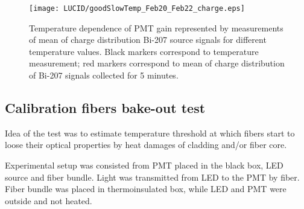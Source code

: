 \begin{figure}
\centering
\texttt{[image: LUCID/goodSlowTemp\_Feb20\_Feb22\_charge.eps]}
\caption{Temperature dependence of PMT gain represented by measurements of mean of charge distribution Bi-207 source signals for different temperature values.
Black markers correspond to temperature measurement; red markers correspond to mean of charge distribution of Bi-207 signals collected for 5 minutes.}
\label{fig:PMTChargeTempDep}
\end{figure}


\subsection{Calibration fibers bake-out test}

% 
% 
% 


Idea of the test was to estimate temperature threshold at which fibers start to loose their optical properties
by heat damages of cladding and/or fiber core.

Experimental setup was consisted from PMT placed in the black box, LED source and fiber bundle.
Light was transmitted from LED to the PMT by fiber.
Fiber bundle was placed in thermoinsulated box, while LED and PMT were outside and not heated.

